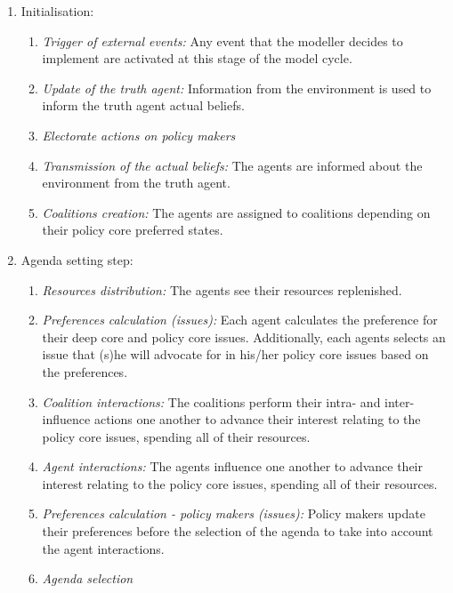 \documentclass[11pt]{article}
\begin{document}
\begin{enumerate}
\item Initialisation:
	
	\begin{enumerate}
	\item \emph{Trigger of external events:} Any event that the modeller decides to implement are activated at this stage of the model cycle.
	\item \emph{Update of the truth agent:} Information from the environment is used to inform the truth agent actual beliefs.
	\item \emph{Electorate actions on policy makers}
	\item \emph{Transmission of the actual beliefs:} The agents are informed about the environment from the truth agent.
	\item \emph{Coalitions creation:} The agents are assigned to coalitions depending on their policy core preferred states.
	\end{enumerate}
	
\item Agenda setting step:
	\begin{enumerate}
	\item \emph{Resources distribution:} The agents see their resources replenished.
	\item \emph{Preferences calculation (issues):} Each agent calculates the preference for their deep core and policy core issues. Additionally, each agents selects an issue that (s)he will advocate for in his/her policy core issues based on the preferences.
	\item \emph{Coalition interactions:} The coalitions perform their intra- and inter-influence actions one another to advance their interest relating to the policy core issues, spending all of their resources.
	\item \emph{Agent interactions:} The agents influence one another to advance their interest relating to the policy core issues, spending all of their resources.
	\item \emph{Preferences calculation - policy makers (issues):} Policy makers update their preferences before the selection of the agenda to take into account the agent interactions.
	\item \emph{Agenda selection}
	\end{enumerate}
	

\end{enumerate}
\end{document}
